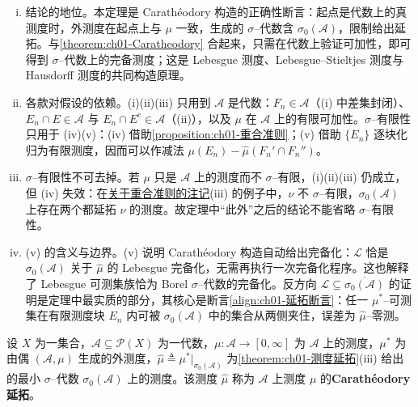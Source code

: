 \documentclass[../../main.tex]{subfiles}%
\begin{document}
\begin{remark}\label{remark:ch01-测度延拓}
\begin{enumerate}[(i)]
\item 结论的地位。本定理是 Carathéodory 构造的正确性断言：起点是代数上的真测度时，外测度在起点上与 $\mu$ 一致，生成的 $\sigma$--代数含 $\sigma_0(\mathcal{A})$，限制给出延拓。与\cref{theorem:ch01-Caratheodory} 合起来，只需在代数上验证可加性，即可得到 $\sigma$--代数上的完备测度；这是 Lebesgue 测度、Lebesgue--Stieltjes 测度与 Hausdorff 测度的共同构造原理。
\item 各款对假设的依赖。(i)(ii)(iii) 只用到 $\mathcal{A}$ 是代数：$F_n\in\mathcal{A}$（(i) 中差集封闭）、$E_n\cap E\in\mathcal{A}$ 与 $E_n\cap E^c\in\mathcal{A}$（(ii)），以及 $\mu$ 在 $\mathcal{A}$ 上的有限可加性。$\sigma$--有限性只用于 (iv)(v)：(iv) 借助\cref{proposition:ch01-重合准则}；(v) 借助 $\{E_n\}$ 逐块化归为有限测度，因而可以作减法 $\mu(E_n)-\widehat{\mu}(F_n'\cap F_n'')$。
\item $\sigma$--有限性不可去掉。若 $\mu$ 只是 $\mathcal{A}$ 上的测度而不 $\sigma$--有限，(i)(ii)(iii) 仍成立，但 (iv) 失效：在\hyperref[remark:ch01-重合准则]{关于重合准则的注记}(iii) 的例子中，$\nu$ 不 $\sigma$--有限，$\sigma_0(\mathcal{A})$ 上存在两个都延拓 $\nu$ 的测度。故定理中“此外”之后的结论不能省略 $\sigma$--有限性。
\item (v) 的含义与边界。(v) 说明 Carathéodory 构造自动给出完备化：$\mathcal{L}$ 恰是 $\sigma_0(\mathcal{A})$ 关于 $\widehat{\mu}$ 的 Lebesgue 完备化，无需再执行一次完备化程序。这也解释了 Lebesgue 可测集族恰为 Borel $\sigma$--代数的完备化。反方向 $\mathcal{L}\subseteq\overline{\sigma_0(\mathcal{A})}$ 的证明是定理中最实质的部分，其核心是断言\eqref{align:ch01-延拓断言}：任一 $\mu^*$--可测集在有限测度块 $E_n$ 内可被 $\sigma_0(\mathcal{A})$ 中的集合从两侧夹住，误差为 $\widehat{\mu}$--零测。
\end{enumerate}
\end{remark}

\begin{definition}\label{definition:ch01-Caratheodory延拓}
设 $X$ 为一集合，$\mathcal{A}\subseteq\mathcal{P}(X)$ 为一代数，$\mu:\mathcal{A}\to[0,\infty]$ 为 $\mathcal{A}$ 上的测度，$\mu^*$ 为由偶 $(\mathcal{A},\mu)$ 生成的外测度，$\widehat{\mu}\triangleq\mu^*|_{\sigma_0(\mathcal{A})}$ 为\cref{theorem:ch01-测度延拓}(iii) 给出的最小 $\sigma$--代数 $\sigma_0(\mathcal{A})$ 上的测度。该测度 $\widehat{\mu}$ 称为 $\mathcal{A}$ 上测度 $\mu$ 的\textbf{Carathéodory 延拓}。
\end{definition}
\end{document}
